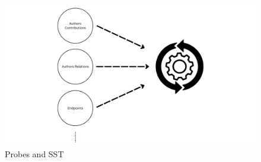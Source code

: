 \begin{figure}[H]
    \centering
    \includegraphics[width=1\textwidth]{figures/sst_working.png}
    \caption[Probes and SST]{Probes and SST}
    \label{fig_probes_sst}
\end{figure}

